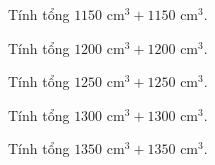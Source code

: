 \begin{ex}
  Tính tổng $1150\text{ cm}^3 + 1150\text{ cm}^3$.
\end{ex}

\begin{ex}
  Tính tổng $1200\text{ cm}^3 + 1200\text{ cm}^3$.
\end{ex}

\begin{ex}
  Tính tổng $1250\text{ cm}^3 + 1250\text{ cm}^3$.
\end{ex}

\begin{ex}
  Tính tổng $1300\text{ cm}^3 + 1300\text{ cm}^3$.
\end{ex}

\begin{ex}
  Tính tổng $1350\text{ cm}^3 + 1350\text{ cm}^3$.
\end{ex}

